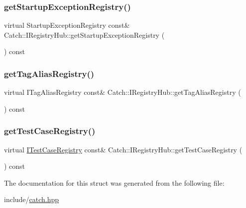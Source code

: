 \mbox{\label{struct_catch_1_1_i_registry_hub_a00281210628e6c616aca1d3e0d84db04}} 
\subsubsection{\texorpdfstring{getStartupExceptionRegistry()}{getStartupExceptionRegistry()}}
{\footnotesize\ttfamily virtual Startup\+Exception\+Registry const\& Catch\+::\+I\+Registry\+Hub\+::get\+Startup\+Exception\+Registry (\begin{DoxyParamCaption}{ }\end{DoxyParamCaption}) const\hspace{0.3cm}{\ttfamily [pure virtual]}}

\mbox{\label{struct_catch_1_1_i_registry_hub_a3c511b1d33e5a6d95c333a0ff387df1a}} 
\subsubsection{\texorpdfstring{getTagAliasRegistry()}{getTagAliasRegistry()}}
{\footnotesize\ttfamily virtual I\+Tag\+Alias\+Registry const\& Catch\+::\+I\+Registry\+Hub\+::get\+Tag\+Alias\+Registry (\begin{DoxyParamCaption}{ }\end{DoxyParamCaption}) const\hspace{0.3cm}{\ttfamily [pure virtual]}}

\mbox{\label{struct_catch_1_1_i_registry_hub_af4f6255f0c0f8f1f179fa9d7d4843076}} 
\subsubsection{\texorpdfstring{getTestCaseRegistry()}{getTestCaseRegistry()}}
{\footnotesize\ttfamily virtual \mbox{\hyperlink{struct_catch_1_1_i_test_case_registry}{I\+Test\+Case\+Registry}} const\& Catch\+::\+I\+Registry\+Hub\+::get\+Test\+Case\+Registry (\begin{DoxyParamCaption}{ }\end{DoxyParamCaption}) const\hspace{0.3cm}{\ttfamily [pure virtual]}}



The documentation for this struct was generated from the following file\+:\begin{DoxyCompactItemize}
\item 
include/\mbox{\hyperlink{catch_8hpp}{catch.\+hpp}}\end{DoxyCompactItemize}
